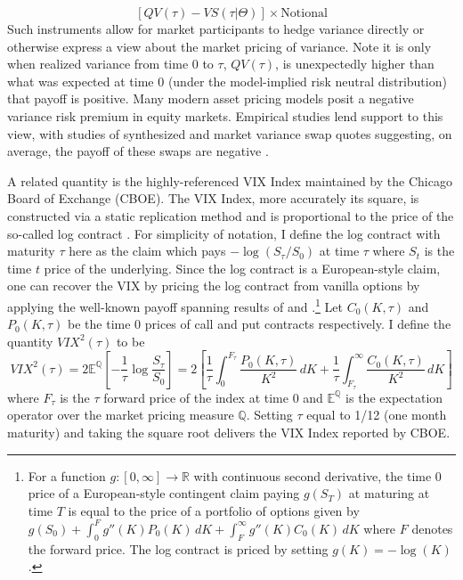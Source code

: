 \documentclass[12pt]{article}
\begin{document}
$$\left[QV(\tau) - VS(\tau\vert \Theta) \right] \times \text{Notional}$$
Such instruments allow for market participants to hedge variance directly or otherwise express a view about the market pricing of variance. Note it is only when realized variance from time $0$ to $\tau$, $QV(\tau)$, is unexpectedly higher than what was expected at time $0$ (under the model-implied risk neutral distribution) that payoff is positive. Many modern asset pricing models posit a negative variance risk premium in equity markets. Empirical studies lend support to this view, with studies of synthesized and market variance swap quotes suggesting, on average, the payoff of these swaps are negative \citep{carr2009variance, konstantinidi2016does}. 

A related quantity is the highly-referenced VIX Index maintained by the Chicago Board of Exchange (CBOE). The VIX Index, more accurately its square, is constructed via a static replication method and is proportional to the price of the so-called log contract \citep{neuberger1994log}. For simplicity of notation, I define the log contract with maturity $\tau$ here as the claim which pays $-\log(S_{\tau}/S_0)$ at time $\tau$ where $S_t$ is the time $t$ price of the underlying.  Since the log contract is a European-style claim, one can recover the VIX by pricing the log contract from vanilla options by applying the well-known payoff spanning results of \cite{breeden1978prices} and \cite{carr1998towards}.\footnote{For a function $g: [0,\infty]\to \mathbb{R}$ with continuous second derivative, the time 0 price of a European-style contingent claim paying $g(S_T)$ at maturing at time $T$ is equal to the price of a portfolio of options given by $g(S_0) + \int_0^F g''(K)P_0(K) \, dK +  \int_F^\infty g''(K)C_0(K) \, dK $ where $F$ denotes the forward price. The log contract is priced by setting $g(K) = -\log(K)$.} Let $C_0(K, \tau)$ and $P_0(K, \tau)$ be the time 0 prices of call and put contracts respectively. I define the quantity $VIX^2(\tau)$ to be
\begin{equation}\label{eq: VIX}
    VIX^2(\tau) = 2 \mathbb{E}^\mathbb{Q}\left[-\dfrac{1}{\tau}\log\dfrac{S_\tau}{S_0}\right] = 2\left[\dfrac{1}{\tau}\int_0^{F_\tau} \dfrac{P_0(K,\tau)}{K^2} \, dK + \dfrac{1}{\tau} \int_{F_\tau}^\infty \dfrac{C_0(K,\tau)}{K^2}  \, dK \right]
\end{equation}
where $F_\tau$ is the $\tau$ forward price of the index at time 0 and $\mathbb{E}^\mathbb{Q}$ is the expectation operator over the market pricing measure $\mathbb{Q}$. Setting $\tau$ equal to 1/12 (one month maturity) and taking the square root delivers the VIX Index reported by CBOE. 
\end{document}
